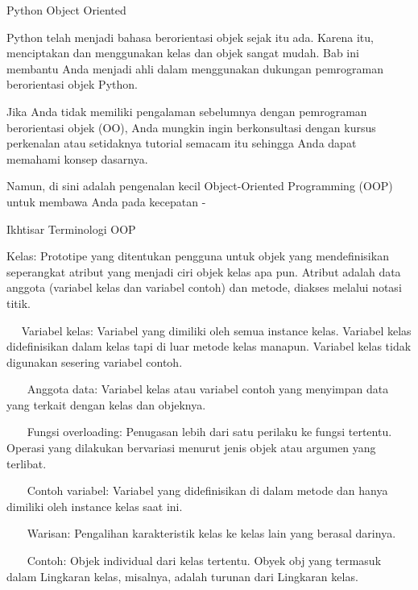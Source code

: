 
 
Python Object Oriented \par
Python telah menjadi bahasa berorientasi objek sejak itu ada. Karena itu, menciptakan dan menggunakan kelas dan objek sangat mudah. Bab ini membantu Anda menjadi ahli dalam menggunakan dukungan pemrograman berorientasi objek Python. \par
\vspace{12pt}
Jika Anda tidak memiliki pengalaman sebelumnya dengan pemrograman berorientasi objek (OO), Anda mungkin ingin berkonsultasi dengan kursus perkenalan atau setidaknya tutorial semacam itu sehingga Anda dapat memahami konsep dasarnya. \par
\vspace{12pt}
Namun, di sini adalah pengenalan kecil Object-Oriented Programming (OOP) untuk membawa Anda pada kecepatan - \par
Ikhtisar Terminologi OOP \par
\vspace{12pt}
Kelas: Prototipe yang ditentukan pengguna untuk objek yang mendefinisikan seperangkat atribut yang menjadi ciri objek kelas apa pun. Atribut adalah data anggota (variabel kelas dan variabel contoh) dan metode, diakses melalui notasi titik. \par
\vspace{12pt}
~~ Variabel kelas: Variabel yang dimiliki oleh semua instance kelas. Variabel kelas didefinisikan dalam kelas tapi di luar metode kelas manapun. Variabel kelas tidak digunakan sesering variabel contoh. \par
\vspace{12pt}
~~~ Anggota data: Variabel kelas atau variabel contoh yang menyimpan data yang terkait dengan kelas dan objeknya. \par
\vspace{12pt}
~~~ Fungsi overloading: Penugasan lebih dari satu perilaku ke fungsi tertentu. Operasi yang dilakukan bervariasi menurut jenis objek atau argumen yang terlibat. \par
\vspace{12pt}
~~~ Contoh variabel: Variabel yang didefinisikan di dalam metode dan hanya dimiliki oleh instance kelas saat ini. \par
\vspace{12pt}
~~~ Warisan: Pengalihan karakteristik kelas ke kelas lain yang berasal darinya. \par
\vspace{12pt}
~~~ Contoh: Objek individual dari kelas tertentu. Obyek obj yang termasuk dalam Lingkaran kelas, misalnya, adalah turunan dari Lingkaran kelas. \par
